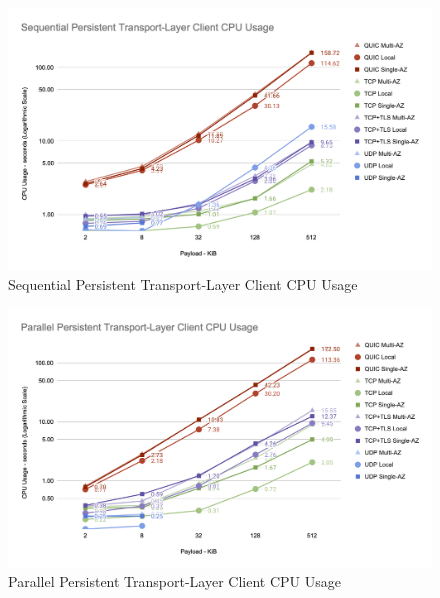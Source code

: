 \begin{figure}[h!]
    \centering
    \includegraphics[width=\linewidth]{figures/charts/Sequential Persistent Transport-Layer Client CPU Usage.png}
    \caption{Sequential Persistent Transport-Layer Client CPU Usage}
    \label{fig:sequential_client_transport_cpu}
\end{figure}
\begin{figure}[h!]
    \centering
    \includegraphics[width=\linewidth]{figures/charts/Parallel Persistent Transport-Layer Client CPU Usage.png}
    \caption{Parallel Persistent Transport-Layer Client CPU Usage}
    \label{fig:parallel_client_transport_cpu}
\end{figure}


